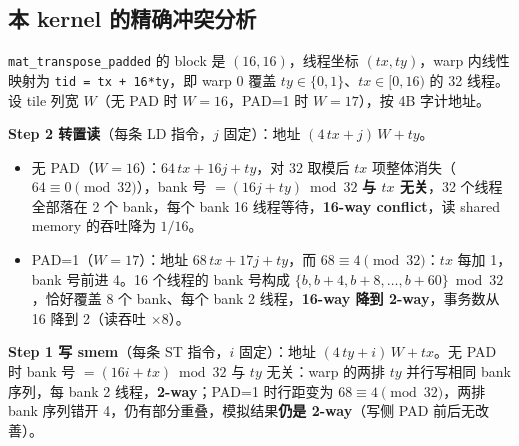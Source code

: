 \subsection{本 kernel 的精确冲突分析}

\texttt{mat\_\allowbreak{}transpose\_\allowbreak{}padded} 的 block 是 $(16,16)$，线程坐标 $(tx, ty)$，warp 内线性映射为 \texttt{tid = tx + 16*ty}，即 warp 0 覆盖 $ty \in \{0,1\}$、$tx \in [0,16)$ 的 32 线程。设 tile 列宽 $W$（无 PAD 时 $W = 16$，PAD=1 时 $W = 17$），按 4B 字计地址。

\textbf{Step 2 转置读}（每条 LD 指令，$j$ 固定）：地址 $(4\,tx + j)\,W + ty$。
\begin{itemize}
  \item 无 PAD（$W = 16$）：$64\,tx + 16j + ty$，对 32 取模后 $tx$ 项整体消失（$64 \equiv 0 \pmod{32}$），bank 号 $= (16j + ty) \bmod 32$ \textbf{与 $tx$ 无关}，32 个线程全部落在 2 个 bank，每个 bank 16 线程等待，\textbf{16-way conflict}，读 shared memory 的吞吐降为 $1/16$。
  \item PAD=1（$W = 17$）：地址 $68\,tx + 17j + ty$，而 $68 \equiv 4 \pmod{32}$：$tx$ 每加 1，bank 号前进 4。16 个线程的 bank 号构成 $\{b, b{+}4, b{+}8, \dots, b{+}60\} \bmod 32$，恰好覆盖 8 个 bank、每个 bank 2 线程，\textbf{16-way 降到 2-way}，事务数从 16 降到 2（读吞吐 $\times 8$）。
\end{itemize}

\textbf{Step 1 写 smem}（每条 ST 指令，$i$ 固定）：地址 $(4\,ty + i)\,W + tx$。无 PAD 时 bank 号 $= (16i + tx) \bmod 32$ 与 $ty$ 无关：warp 的两排 $ty$ 并行写相同 bank 序列，每 bank 2 线程，\textbf{2-way}；PAD=1 时行距变为 $68 \equiv 4 \pmod{32}$，两排 bank 序列错开 4，仍有部分重叠，模拟结果\textbf{仍是 2-way}（写侧 PAD 前后无改善）。

